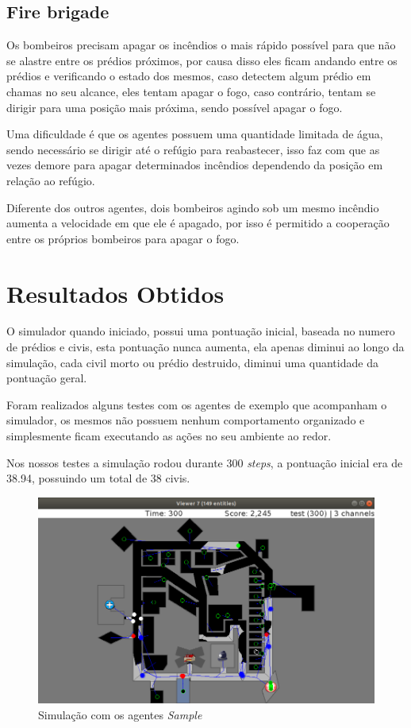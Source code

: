 \documentclass[conference]{IEEEtran}
\begin{document}
\subsection{Fire brigade}
Os bombeiros precisam apagar os incêndios o mais rápido possível para que não se alastre entre os prédios próximos, por causa disso eles ficam andando entre os prédios e verificando o estado dos mesmos, caso detectem algum prédio em chamas no seu alcance, eles tentam apagar o fogo, caso contrário, tentam se dirigir para uma posição mais próxima, sendo possível apagar o fogo.

Uma dificuldade é que os agentes possuem uma quantidade limitada de água, sendo necessário se dirigir até o refúgio para reabastecer, isso faz com que as vezes demore para apagar determinados incêndios dependendo da posição em relação ao refúgio.

Diferente dos outros agentes, dois bombeiros agindo sob um mesmo incêndio aumenta a velocidade em que ele é apagado, por isso é permitido a cooperação entre os próprios bombeiros para apagar o fogo.

\section{Resultados Obtidos}
O simulador quando iniciado, possui uma pontuação inicial, baseada no numero de prédios e civis, esta pontuação nunca aumenta, ela apenas diminui ao longo da simulação, cada civil morto ou prédio destruido, diminui uma quantidade da pontuação geral.

Foram realizados alguns testes com os agentes de exemplo que acompanham o simulador, os mesmos não possuem nenhum comportamento organizado e simplesmente ficam executando as ações no seu ambiente ao redor.

Nos nossos testes a simulação rodou durante 300 \textit{steps}, a pontuação inicial era de 38.94, possuindo um total de 38 civis. 
\begin{figure}[htbp]
\centerline{\includegraphics[scale=0.27]{fig4.png}}
\caption{Simulação com os agentes \textit{Sample}}
\label{fig4}
\end{figure}
\end{document}
